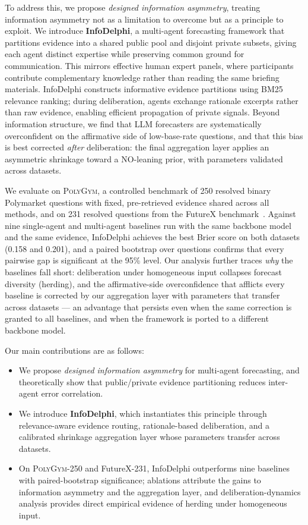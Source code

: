 To address this, we propose \textit{designed information asymmetry}, treating information asymmetry not as a limitation to overcome but as a principle to exploit.
We introduce \textbf{InfoDelphi}, a multi-agent forecasting framework that partitions evidence into a shared public pool and disjoint private subsets, giving each agent distinct expertise while preserving common ground for communication.
This mirrors effective human expert panels, where participants contribute complementary knowledge rather than reading the same briefing materials.
InfoDelphi constructs informative evidence partitions using BM25 relevance ranking; during deliberation, agents exchange rationale excerpts rather than raw evidence, enabling efficient propagation of private signals.
Beyond information structure, we find that LLM forecasters are systematically overconfident on the affirmative side of low-base-rate questions, and that this bias is best corrected \emph{after} deliberation: the final aggregation layer applies an asymmetric shrinkage toward a NO-leaning prior, with parameters validated across datasets.

We evaluate on \textsc{PolyGym}, a controlled benchmark of 250 resolved binary Polymarket questions with fixed, pre-retrieved evidence shared across all methods, and on 231 resolved questions from the FutureX benchmark~\citep{zeng2025futurex}.
Against nine single-agent and multi-agent baselines run with the same backbone model and the same evidence, InfoDelphi achieves the best Brier score on both datasets (0.158 and 0.201), and a paired bootstrap over questions confirms that every pairwise gap is significant at the 95\% level.
Our analysis further traces \emph{why} the baselines fall short: deliberation under homogeneous input collapses forecast diversity (herding), and the affirmative-side overconfidence that afflicts every baseline is corrected by our aggregation layer with parameters that transfer across datasets --- an advantage that persists even when the same correction is granted to all baselines, and when the framework is ported to a different backbone model.

Our main contributions are as follows:
\begin{itemize}[nosep,leftmargin=20pt,topsep=2pt,itemsep=1pt,parsep=0pt]
  \item We propose \textit{designed information asymmetry} for multi-agent forecasting, and theoretically show that public/private evidence partitioning reduces inter-agent error correlation.
  \item We introduce \textbf{InfoDelphi}, which instantiates this principle through relevance-aware evidence routing, rationale-based deliberation, and a calibrated shrinkage aggregation layer whose parameters transfer across datasets.
  \item On \textsc{PolyGym}-250 and FutureX-231, InfoDelphi outperforms nine baselines with paired-bootstrap significance; ablations attribute the gains to information asymmetry and the aggregation layer, and deliberation-dynamics analysis provides direct empirical evidence of herding under homogeneous input.
\end{itemize}
